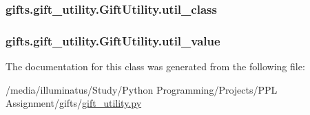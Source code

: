 \subsubsection[{\texorpdfstring{util\+\_\+class}{util_class}}]{\setlength{\rightskip}{0pt plus 5cm}gifts.\+gift\+\_\+utility.\+Gift\+Utility.\+util\+\_\+class}\hypertarget{classgifts_1_1gift__utility_1_1_gift_utility_a24c52333a19b3fd3f12e35d4ffc23995}{}\label{classgifts_1_1gift__utility_1_1_gift_utility_a24c52333a19b3fd3f12e35d4ffc23995}
\subsubsection[{\texorpdfstring{util\+\_\+value}{util_value}}]{\setlength{\rightskip}{0pt plus 5cm}gifts.\+gift\+\_\+utility.\+Gift\+Utility.\+util\+\_\+value}\hypertarget{classgifts_1_1gift__utility_1_1_gift_utility_a1094dc899092b5ba3016185e06b45fc3}{}\label{classgifts_1_1gift__utility_1_1_gift_utility_a1094dc899092b5ba3016185e06b45fc3}


The documentation for this class was generated from the following file\+:\begin{DoxyCompactItemize}
\item 
/media/illuminatus/\+Study/\+Python Programming/\+Projects/\+P\+P\+L Assignment/gifts/\hyperlink{gift__utility_8py}{gift\+\_\+utility.\+py}\end{DoxyCompactItemize}
